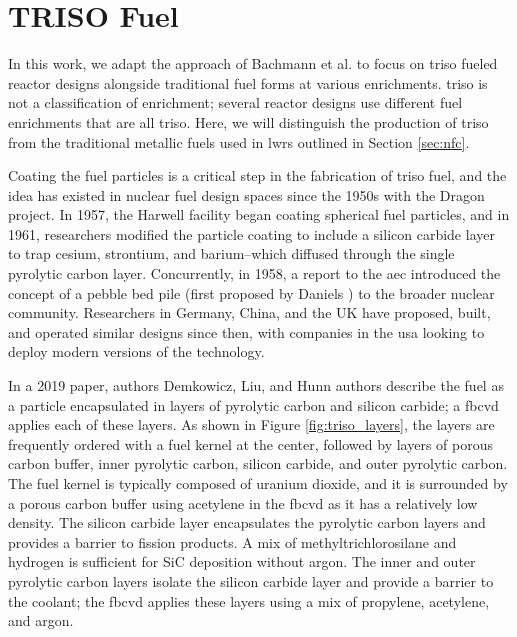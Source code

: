 \section{TRISO Fuel}
\label{sec:triso_fuel}

In this work, we adapt the approach of Bachmann et al.
\cite{bachmann_enrichment_2021} to focus on \gls{triso} fueled reactor designs
alongside traditional fuel forms at various enrichments. \gls{triso} is not a
classification of enrichment; several reactor designs use different fuel
enrichments that are all \gls{triso}. Here, we will distinguish the
production of \gls{triso} from the traditional metallic fuels used in
\glspl{lwr} outlined in Section \ref{sec:nfc}.

Coating the fuel particles is a critical step in the fabrication of \gls{triso}
fuel, and the idea has existed in nuclear fuel design spaces since the 1950s
\cite{price_dragon_2012} with the Dragon project. In 1957, the Harwell facility
began coating spherical fuel particles, and in 1961, researchers modified the
particle coating to include a silicon carbide layer to trap cesium, strontium,
and barium--which diffused through the single pyrolytic carbon layer.
Concurrently, in 1958, a report to the \gls{aec} introduced the concept of a
pebble bed pile (first proposed by Daniels
\cite{f_b_daniels_suggestions_1944}) to the broader nuclear community.
Researchers in Germany, China, and the UK have proposed, built, and operated
similar designs since then, with companies in the \gls{usa} looking to deploy
modern versions of the technology.

In a 2019 paper, authors Demkowicz, Liu, and Hunn \cite{particle_review_2019}
authors describe the fuel as a particle encapsulated in layers of pyrolytic
carbon and silicon carbide; a \gls{fbcvd} applies each of these layers. As
shown in Figure \ref{fig:triso_layers}, the layers are frequently ordered with
a fuel kernel at the center, followed by layers of porous carbon buffer, inner
pyrolytic carbon, silicon carbide, and outer pyrolytic carbon. The fuel kernel
is typically composed of uranium dioxide, and it is surrounded by a porous
carbon buffer using acetylene in the \gls{fbcvd} as it has a relatively low
density. The silicon carbide layer encapsulates the pyrolytic carbon layers and
provides a barrier to fission products. A mix of methyltrichlorosilane and
hydrogen is sufficient for SiC deposition without argon. The inner and outer
pyrolytic carbon layers isolate the silicon carbide layer and provide a barrier
to the coolant; the \gls{fbcvd} applies these layers using a mix of propylene,
acetylene, and argon.

